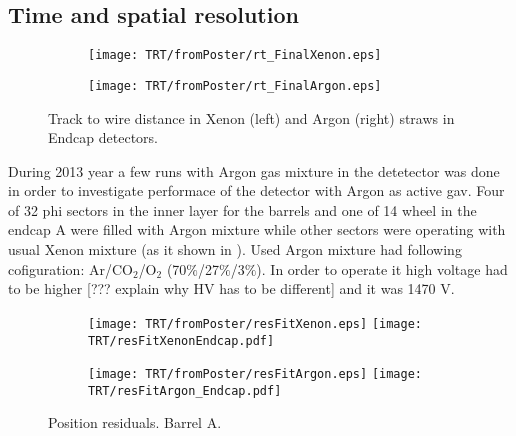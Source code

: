 \subsection{Time and spatial resolution}
\label{subsec:TRT:trackPerf}


\begin{figure}

\begin{subfigure}{.5\textwidth}
  \centering
  \texttt{[image: TRT/fromPoster/rt\_FinalXenon.eps]}
\end{subfigure}%
\begin{subfigure}{.5\textwidth}
  \centering
  \texttt{[image: TRT/fromPoster/rt\_FinalArgon.eps]}
\end{subfigure}

\caption{Track to wire distance in Xenon (left) and Argon (right) straws in Endcap detectors.}
  \label{fig:RT_xenon_argon}
\end{figure}

During 2013 year a few runs with Argon gas mixture in the detetector was done in order to investigate performace of the detector with Argon as active gav.
Four of 32 phi sectors in the inner layer for the barrels and one of 14 wheel in the endcap A were filled with Argon mixture while other sectors were operating 
with usual Xenon mixture (as it shown in ). Used Argon mixture had following cofiguration: Ar/CO$_{2}$/O$_{2}$ (70$\%$/27$\%$/3$\%$). In order to operate it high voltage had
to be higher [??? explain why HV has to be different] and it was 1470 V.




\begin{figure}

\begin{subfigure}{.5\textwidth}
  \centering
  \texttt{[image: TRT/fromPoster/resFitXenon.eps]}
  \texttt{[image: TRT/resFitXenonEndcap.pdf]}
\end{subfigure}%
\begin{subfigure}{.5\textwidth}
  \centering
  \texttt{[image: TRT/fromPoster/resFitArgon.eps]}
  \texttt{[image: TRT/resFitArgon\_Endcap.pdf]}
\end{subfigure}

\caption{Position residuals. Barrel A.}
  \label{fig:resFit}
\end{figure}






